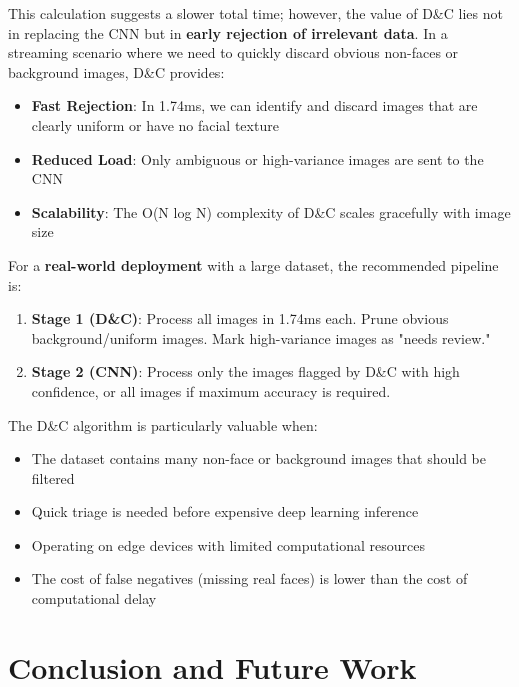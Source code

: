 \documentclass[conference]{IEEEtran}
\begin{document}
This calculation suggests a slower total time; however, the value of D\&C lies not in replacing the CNN but in \textbf{early rejection of irrelevant data}. In a streaming scenario where we need to quickly discard obvious non-faces or background images, D\&C provides:

\begin{itemize}
    \item \textbf{Fast Rejection}: In 1.74ms, we can identify and discard images that are clearly uniform or have no facial texture
    \item \textbf{Reduced Load}: Only ambiguous or high-variance images are sent to the CNN
    \item \textbf{Scalability}: The O(N log N) complexity of D\&C scales gracefully with image size
\end{itemize}

For a \textbf{real-world deployment} with a large dataset, the recommended pipeline is:

\begin{enumerate}
    \item \textbf{Stage 1 (D\&C)}: Process all images in 1.74ms each. Prune obvious background/uniform images. Mark high-variance images as "needs review."
    \item \textbf{Stage 2 (CNN)}: Process only the images flagged by D\&C with high confidence, or all images if maximum accuracy is required.
\end{enumerate}

The D\&C algorithm is particularly valuable when:
\begin{itemize}
    \item The dataset contains many non-face or background images that should be filtered
    \item Quick triage is needed before expensive deep learning inference
    \item Operating on edge devices with limited computational resources
    \item The cost of false negatives (missing real faces) is lower than the cost of computational delay
\end{itemize}

\section{Conclusion and Future Work}
\label{sec:conclusion}
\end{document}
